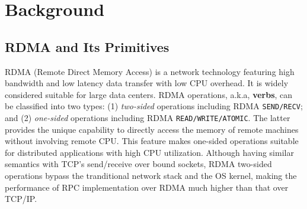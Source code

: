 \section{Background}
%

\subsection{RDMA and Its Primitives}


RDMA (Remote Direct Memory Access) is a network technology featuring high bandwidth and 
low latency data transfer with low CPU overhead. 
It is widely considered suitable for large data centers. RDMA operations, a.k.a, \textbf{verbs}, can be classified into two types:
(1) {\em two-sided} operations including RDMA
\texttt{SEND/RECV}; and 
(2) {\em one-sided} operations including RDMA
\texttt{READ/WRITE/ATOMIC}.
The latter provides the unique capability to directly access the memory of remote machines without involving remote CPU. 
This feature makes one-sided operations suitable for distributed applications with high CPU utilization. 
Although having similar semantics with TCP's send/receive over bound sockets,
RDMA two-sided operations bypass the tranditional network stack and the OS kernel, 
making the performance of 
RPC implementation over RDMA much higher than
that over TCP/IP.



